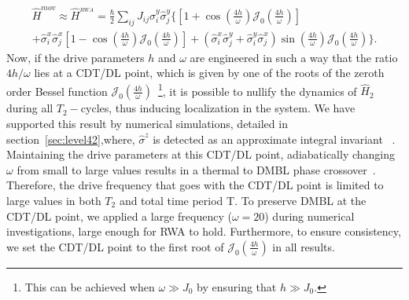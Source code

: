\documentclass[12pt]{iopart}
\begin{document}
\begin{multline}
\hat{H}^{mov}\approx \hat{H}^{_{RWA}} = \frac{\hbar}{2}\sum_{ij} J_{ij} \hat{\sigma}^y_i\hat{\sigma}^y_j\Bigg\{\left[1+\cos(\frac{4h}{\omega})\mathcal{J}_0\left(\frac{4h}{\omega}\right)\right] \\
+ \hat{\sigma}^x_i\hat{\sigma}^x_j \left[1-\cos(\frac{4h}{\omega})\mathcal{J}_0\left(\frac{4h}{\omega}\right)\right]
+ \left(\hat{\sigma}^x_i\hat{\sigma}^y_j+\hat{\sigma}^y_i\hat{\sigma}^x_j\right)\sin(\frac{4h}{\omega})\mathcal{J}_0\left(\frac{4h}{\omega}\right) \Bigg\}.
\label{eq:movham1}
\end{multline}
Now, if the drive parameters $h$ and $\omega$  are engineered in such a way that the ratio ${4h}/{\omega}$ lies at a CDT/DL point, which is given by one of the roots of the zeroth order Bessel function $\mathcal{J}_0\left(\frac{4h}{\omega}\right)$~\footnote{This can be achieved when $\omega \gg J_0$ by ensuring that $h\gg J_0$.}, it is possible to nullify the dynamics of $\hat{H}_2$ during all $T_2-$cycles, thus inducing localization in the system. We have supported this result by numerical simulations, detailed in section~\ref{sec:level42},where, $\hat{\sigma}^z$ is detected as an approximate integral invariant ~\cite{Keser2016,Dodonov1978}. Maintaining the drive parameters at this CDT/DL point, adiabatically changing $\omega$ from small to large values results in a thermal to DMBL phase crossover~\cite{Mahbub2024}. Therefore, the drive frequency that goes with the CDT/DL point is limited to large values in both $T_2$ and total time period T. To preserve DMBL at the CDT/DL point, we applied a large frequency ($\omega =20$) during numerical investigations, large enough for RWA to hold. Furthermore, to ensure consistency, we set the CDT/DL point to the first root of $\mathcal{J}_0\left(\frac{4h}{\omega}\right)$ in all results.
\end{document}
